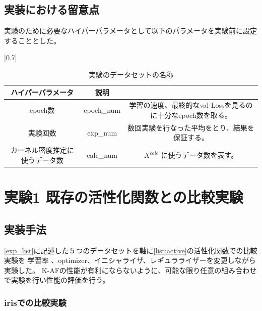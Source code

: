 \subsection{実装における留意点}
実験のために必要なハイパーパラメータとして以下のパラメータを実験前に設定することとした。

\begin{table}[htbp]
    \begin{center}
        \caption{実験のデータセットの名称}
        \vspace{5mm} 
        \scalebox{0.7}[0.7]{
            \begin{tabular}{||c | c |c||}
            ハイパーパラメータ & 説明 \\
            \hline
            epoch数                           & epoch\_num      & 学習の速度、最終的なval-Lossを見るのに十分なepoch数を取る。  \\
            実験回数                           & exp\_num     & 数回実験を行なった平均をとり、結果を保証する。 \\
            カーネル密度推定に使うデータ数        & calc\_num           & $ X^{calc} $ に使うデータ数を表す。  \\
            \end{tabular}
        }
    \end{center}
\end{table}





\vspace{-15mm} 

\section{実験1 既存の活性化関数との比較実験}
\label{exp1}
\subsection{実装手法}

\ref{exp_list}に記述した５つのデータセットを軸に\ref{list:active}の活性化関数での比較実験を
学習率 、optimizer、イニシャライザ、レギュラライザーを変更しながら実験した。
K-AFの性能が有利にならないように、可能な限り任意の組み合わせで実験を行い性能の評価を行う。

\subsubsection{irisでの比較実験}
\label{impl:iris}

